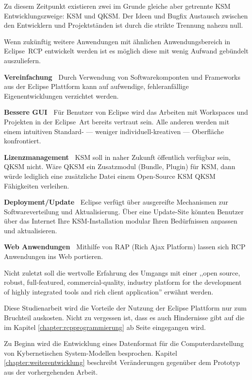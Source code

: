 \documentclass[%
12pt,titlepage,abstracton,DIV=10]{scrreprt}
\begin{document}
Zu diesem Zeitpunkt existieren zwei im Grunde gleiche aber getrennte KSM
Entwicklungszweige: KSM und QKSM. Der Ideen und Bugfix Austausch zwischen den
Entwicklern und Projektständen ist durch die strikte Trennung nahezu null.

Wenn zukünftig weitere Anwendungen mit ähnlichen Anwendungsbereich in
Eclipse~RCP entwickelt werden ist es möglich diese mit wenig Aufwand gebündelt
auszuliefern.

\textbf{Vereinfachung\ } Durch Verwendung von Softwarekomponten und Frameworks
aus der Eclipse Plattform kann auf aufwendige, fehleranfällige
Eigenentwicklungen verzichtet werden.

\textbf{Bessere GUI\ } Für Benutzer von Eclipse wird das Arbeiten mit
Workspaces und Projekten in der Eclipse~Art bereits vertraut sein. Alle anderen
werden mit einem intuitiven Standard- --- weniger individuell-kreativen ---
Oberfläche konfrontiert.

\textbf{Lizenzmanagement\ } KSM soll in naher Zukunft öffentlich verfügbar
sein, QKSM nicht. Wäre QKSM ein Zusatzmodul (Bundle, Plugin) für KSM, dann
würde lediglich eine zusätzliche Datei einem Open-Source KSM QKSM Fähigkeiten
verleihen.

\textbf{Deployment/Update\ } Eclipse verfügt über ausgereifte Mechanismen zur
Softwareverteilung und Aktualisierung. Über eine Update-Site könnten Benutzer
über das Internet Ihre KSM-Installation modular Ihren Bedürfnissen anpassen und
aktualisieren.

\textbf{Web Anwendungen\ } Mithilfe von RAP (Rich Ajax Platform) lassen sich
RCP Anwendungen ins Web portieren.

Nicht zuletzt soll die wertvolle Erfahrung des Umgangs mit einer ,,open source,
robust, full-featured, commercial-quality, industry platform for the development
of highly integrated tools and rich client application'' erwähnt werden.

\vspace{1cm}

Diese Studienarbeit wird die Vorteile der Nutzung der Eclipse Plattform nur zum
Bruchteil auskosten. Nicht zu vergessen ist, dass es auch Hindernisse gibt auf
die im Kapitel \ref{chapter:rcpprogrammierung} ab Seite
\pageref{chapter:rcpprogrammierung} eingegangen wird.

Zu Beginn wird die Entwicklung eines Datenformat für die Computerdarstellung von
Kybernetischen System-Modellen besprochen. Kapitel
\ref{chapter:weiterentwicklung} beschreibt Veränderungen gegenüber dem Prototyp
aus der vorhergehenden Arbeit.
\end{document}
